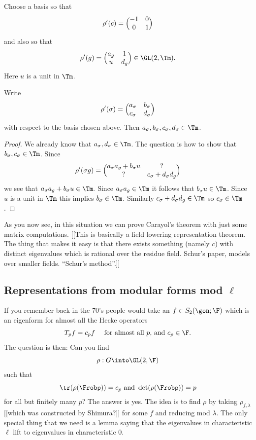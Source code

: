\documentclass{report}
\begin{document}
Choose a basis so that
$$\rho'(c)=
   \Bigl(\begin{matrix}-1&0\\
                      0& 1
        \end{matrix}\Bigr)$$
and also so that
$$
\rho'(g)=
   \Bigl(\begin{matrix}a_g&1\\
                      u& d_g
        \end{matrix}\Bigr) \in \GL(2,\Tm).$$
Here $u$ is a unit in $\Tm$.
\begin{proposition}
  Write
    $$\rho'(\sigma)=
      \Bigl(\begin{matrix}a_{\sigma} & b_{\sigma}\\
                      c_{\sigma} & d_{\sigma}
           \end{matrix}\Bigr)$$
with respect to the basis chosen above.
  Then $a_{\sigma}, b_{\sigma}, c_{\sigma}, d_{\sigma}\in\Tm$.
\end{proposition}
\begin{proof}
We already know that $a_{\sigma}, d_{\sigma}\in\Tm$. The question is
how to show that $b_{\sigma}, c_{\sigma}\in \Tm$.
Since
$$\rho'(\sigma g)=
      \Bigl(\begin{matrix}a_{\sigma}a_{g}+b_{\sigma}u & ?\\
                         ? & c_{\sigma}+d_{\sigma}d_g
           \end{matrix}\Bigr)$$
we see that $a_{\sigma}a_g+b_{\sigma}u\in\Tm.$ Since
$a_{\sigma}a_g\in\Tm$ it follows that $b_{\sigma}u\in\Tm$.
Since $u$ is a unit in $\Tm$ this implies $b_{\sigma}\in\Tm$.
Similarly $c_{\sigma}+d_{\sigma} d_g\in\Tm$ so $c_{\sigma}\in\Tm$.
\end{proof}

As you now see, in this situation we can prove Carayol's theorem
with just some matrix computations.
[[This is basically a field lowering representation theorem.
The thing that makes it easy is that there exists something (namely
$c$) with distinct eigenvalues which is rational over the residue
field. Schur's paper, models over smaller fields. ``Schur's method''.]]

\subsection{Representations from modular forms mod $\ell$}

If you remember back in the 70's people would take an
$f\in S_2(\gon;\F)$ which is an eigenform for almost
all the Hecke operators
$$T_p f=c_p f\quad\text{ for almost all $p$, and $c_p\in\F$}.$$
The question is then:
Can you find
$$\rho:G\into\GL(2,\F)$$
such that
$$\tr(\rho(\Frobp))=c_p\text{ and }\det(\rho(\Frobp))=p$$
for all but finitely many $p$?
The answer is yes.
The idea is to find $\rho$ by taking $\rho_{f,\lambda}$ [[which was
constructed by Shimura?]] for some $f$ and reducing mod $\lambda$.
The only special thing that we need is a lemma saying that the eigenvalues
in characteristic $\ell$ lift to eigenvalues in characteristic $0$.
\end{document}
